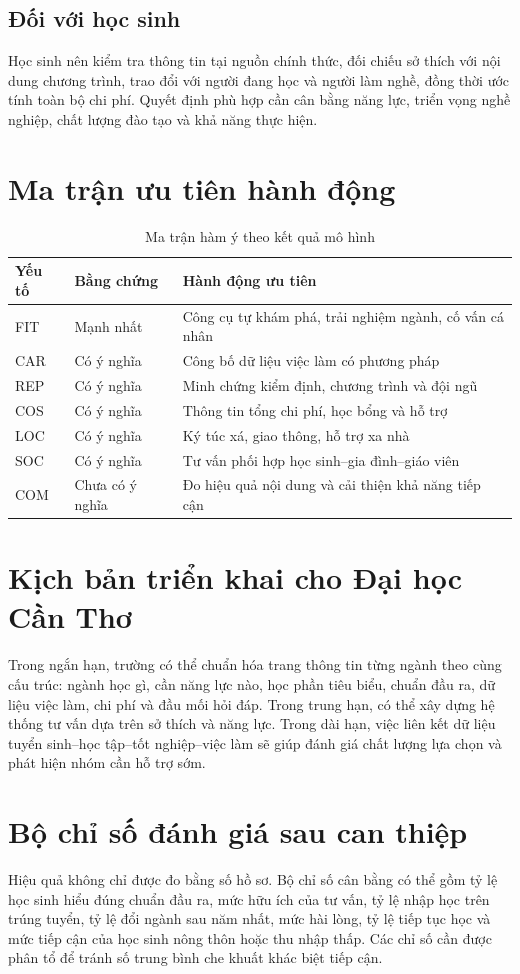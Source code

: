 \subsection{Đối với học sinh}
Học sinh nên kiểm tra thông tin tại nguồn chính thức, đối chiếu sở thích với nội dung chương trình, trao đổi với người đang học và người làm nghề, đồng thời ước tính toàn bộ chi phí. Quyết định phù hợp cần cân bằng năng lực, triển vọng nghề nghiệp, chất lượng đào tạo và khả năng thực hiện.

\section{Ma trận ưu tiên hành động}
\begin{table}[H]\centering\caption{Ma trận hàm ý theo kết quả mô hình}\begin{tabularx}{\textwidth}{p{2.2cm}p{2.6cm}X}\toprule Yếu tố & Bằng chứng & Hành động ưu tiên\\\midrule
FIT & Mạnh nhất & Công cụ tự khám phá, trải nghiệm ngành, cố vấn cá nhân\\
CAR & Có ý nghĩa & Công bố dữ liệu việc làm có phương pháp\\
REP & Có ý nghĩa & Minh chứng kiểm định, chương trình và đội ngũ\\
COS & Có ý nghĩa & Thông tin tổng chi phí, học bổng và hỗ trợ\\
LOC & Có ý nghĩa & Ký túc xá, giao thông, hỗ trợ xa nhà\\
SOC & Có ý nghĩa & Tư vấn phối hợp học sinh--gia đình--giáo viên\\
COM & Chưa có ý nghĩa & Đo hiệu quả nội dung và cải thiện khả năng tiếp cận\\\bottomrule
\end{tabularx}\end{table}

\section{Kịch bản triển khai cho Đại học Cần Thơ}
Trong ngắn hạn, trường có thể chuẩn hóa trang thông tin từng ngành theo cùng cấu trúc: ngành học gì, cần năng lực nào, học phần tiêu biểu, chuẩn đầu ra, dữ liệu việc làm, chi phí và đầu mối hỏi đáp. Trong trung hạn, có thể xây dựng hệ thống tư vấn dựa trên sở thích và năng lực. Trong dài hạn, việc liên kết dữ liệu tuyển sinh--học tập--tốt nghiệp--việc làm sẽ giúp đánh giá chất lượng lựa chọn và phát hiện nhóm cần hỗ trợ sớm.

\section{Bộ chỉ số đánh giá sau can thiệp}
Hiệu quả không chỉ được đo bằng số hồ sơ. Bộ chỉ số cân bằng có thể gồm tỷ lệ học sinh hiểu đúng chuẩn đầu ra, mức hữu ích của tư vấn, tỷ lệ nhập học trên trúng tuyển, tỷ lệ đổi ngành sau năm nhất, mức hài lòng, tỷ lệ tiếp tục học và mức tiếp cận của học sinh nông thôn hoặc thu nhập thấp. Các chỉ số cần được phân tổ để tránh số trung bình che khuất khác biệt tiếp cận.
